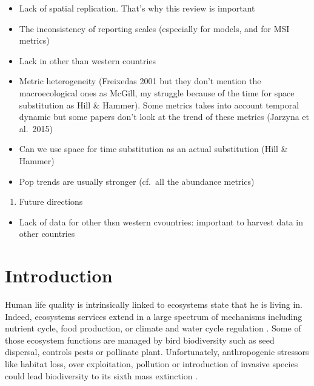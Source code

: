 \documentclass[
  12pt,
  oneside]{report}
\providecommand{\tightlist}{%
  \setlength{\itemsep}{0pt}\setlength{\parskip}{0pt}}
\begin{document}
\begin{itemize}
\tightlist
\item
  Lack of spatial replication. That's why this review is important
\item
  The inconsistency of reporting scales (especially for models, and for MSI metrics)
\item
  Lack in other than western countries
\item
  Metric heterogeneity (Freixedas 2001 but they don't mention the macroecological ones as McGill, my struggle because of the time for space substitution as Hill \& Hammer). Some metrics takes into account temporal dynamic but some papers don't look at the trend of these metrics (Jarzyna et al.~2015)
\item
  Can we use space for time substitution as an actual substitution (Hill \& Hammer)
\item
  Pop trends are usually stronger (cf.~all the abundance metrics)
\end{itemize}

\begin{enumerate}
\def\labelenumi{\arabic{enumi})}
\setcounter{enumi}{2}
\tightlist
\item
  Future directions
\end{enumerate}

\begin{itemize}
\tightlist
\item
  Lack of data for other thsn western cvountries: important to harvest data in other countries
\end{itemize}

\hypertarget{introduction}{%
\chapter{Introduction}\label{introduction}}

Human life quality is intrinsically linked to ecosystems state that he is living in. Indeed, ecosystems services extend in a large spectrum of mechanisms including nutrient cycle, food production, or climate and water cycle regulation \citep{pereira_global_2012}. Some of those ecosystem functions are managed by bird biodiversity such as seed dispersal, controls pests or pollinate plant. Unfortunately, anthropogenic stressors like habitat loss, over exploitation, pollution or introduction of invasive species could lead biodiversity to its sixth mass extinction \citep{barnosky_has_2011}.
\end{document}
